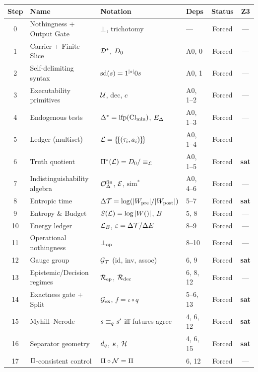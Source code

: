 \begin{table}[h!]
\centering
\small
\begin{tabular}{@{}clllcc@{}}
\toprule
\textbf{Step} & \textbf{Name} & \textbf{Notation} & \textbf{Deps} & \textbf{Status} & \textbf{Z3} \\
\midrule
0 & Nothingness + Output Gate & $\bot$, trichotomy & --- & Forced & --- \\
1 & Carrier + Finite Slice & $\mathcal{D}^*$, $D_0$ & A0, 0 & Forced & --- \\
2 & Self-delimiting syntax & $\mathrm{sd}(s) = 1^{|s|}0s$ & A0, 1 & Forced & --- \\
3 & Executability primitives & $\mathcal{U}$, dec, $c$ & A0, 1--2 & Forced & --- \\
4 & Endogenous tests & $\Delta^* = \mathrm{lfp}(\mathrm{Cl}_{\min})$, $E_\Delta$ & A0, 1--3 & Forced & --- \\
\midrule
5 & Ledger (multiset) & $\mathcal{L} = \{\!\{(\tau_i, a_i)\}\!\}$ & A0, 1--4 & Forced & --- \\
6 & Truth quotient & $\Pi^*(\mathcal{L}) = D_0 / \equiv_{\mathcal{L}}$ & A0, 1--5 & Forced & \textbf{sat} \\
7 & Indistinguishability algebra & $\mathcal{O}^{\mathrm{fin}}_\Delta$, $\mathcal{E}$, $\mathrm{sim}^*$ & A0, 4--6 & Forced & --- \\
\midrule
8 & Entropic time & $\Delta\mathcal{T} = \log(|W_{\mathrm{pre}}|/|W_{\mathrm{post}}|)$ & 5--7 & Forced & \textbf{sat} \\
9 & Entropy \& Budget & $S(\mathcal{L}) = \log|W()|$, $B$ & 5, 8 & Forced & --- \\
10 & Energy ledger & $\mathcal{L}_E$, $\varepsilon = \Delta\mathcal{T} / \Delta E$ & 8--9 & Forced & --- \\
11 & Operational nothingness & $\bot_{\mathrm{op}}$ & 8--10 & Forced & --- \\
\midrule
12 & Gauge group & $\mathcal{G}_{\mathcal{T}}$ (id, inv, assoc) & 6, 9 & Forced & \textbf{sat} \\
13 & Epistemic/Decision regimes & $\mathcal{R}_{\mathrm{ep}}$, $\mathcal{R}_{\mathrm{dec}}$ & 6, 8, 12 & Forced & --- \\
14 & Exactness gate + Split & $\mathcal{G}_{\mathrm{ex}}$, $f = \iota \circ q$ & 5--6, 13 & Forced & \textbf{sat} \\
15 & Myhill--Nerode & $s \equiv_q s'$ iff futures agree & 4, 6, 12 & Forced & \textbf{sat} \\
16 & Separator geometry & $d_q$, $\kappa$, $\mathcal{H}$ & 4, 6, 15 & Forced & \textbf{sat} \\
17 & $\Pi$-consistent control & $\Pi \circ \mathcal{N} = \Pi$ & 6, 12 & Forced & --- \\

\end{tabular}
\end{table}
